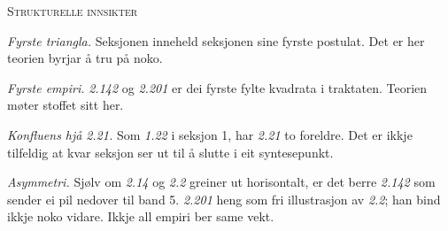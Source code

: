 \documentclass[a4paper,landscape,9pt]{article}
\begin{document}
\begin{minipage}[t]{0.325\textwidth}
{\scshape\small Strukturelle innsikter}

\emph{Fyrste triangla.} Seksjonen inneheld seksjonen sine fyrste postulat. Det er her teorien byrjar å tru på noko.

\emph{Fyrste empiri.} \emph{2.142} og \emph{2.201} er dei fyrste fylte kvadrata i traktaten. Teorien møter stoffet sitt her.

\emph{Konfluens hjå} \emph{2.21.} Som \emph{1.22} i seksjon 1, har \emph{2.21} to foreldre. Det er ikkje tilfeldig at kvar seksjon ser ut til å slutte i eit syntesepunkt.

\emph{Asymmetri.} Sjølv om \emph{2.14} og \emph{2.2} greiner ut horisontalt, er det berre \emph{2.142} som sender ei pil nedover til band 5. \emph{2.201} heng som fri illustrasjon av \emph{2.2}; han bind ikkje noko vidare. Ikkje all empiri ber same vekt.
\end{minipage}
\end{document}
